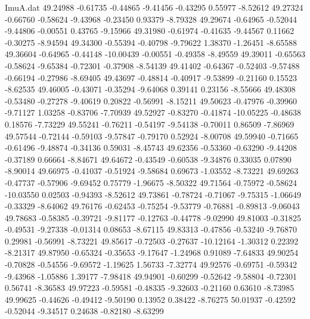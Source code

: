\begin{filecontents}{ImuA.dat}
  49.24988   -0.61735   -0.44865   -9.41456   -0.43295    0.55977   -8.52612
  49.27324   -0.66760   -0.58624   -9.43968   -0.23450    0.93379   -8.79328
  49.29674   -0.64965   -0.52044   -9.44806   -0.00551    0.43765   -9.15966
  49.31980   -0.61974   -0.41635   -9.44567    0.11662   -0.30275   -8.94594
  49.34300   -0.55394   -0.40798   -9.79622    1.38370   -1.26451   -8.65588
  49.36604   -0.64965   -0.44148  -10.00439   -0.00551   -0.49358   -8.49559
  49.39011   -0.65563   -0.58624   -9.65384   -0.72301   -0.37908   -8.54139
  49.41402   -0.64367   -0.52403   -9.57488   -0.66194   -0.27986   -8.69405
  49.43697   -0.48814   -0.40917   -9.53899   -0.21160    0.15523   -8.62535
  49.46005   -0.43071   -0.35294   -9.64068    0.39141    0.23156   -8.55666
  49.48308   -0.53480   -0.27278   -9.40619    0.20822   -0.56991   -8.15211
  49.50623   -0.47976   -0.39960   -9.71127    1.03258   -0.83706   -7.70939
  49.52927   -0.83270   -0.41874  -10.05225   -0.48638    0.18576   -7.73229
  49.55241   -0.76211   -0.54197   -9.54138   -0.70011    0.86509   -7.86969
  49.57544   -0.72144   -0.59103   -9.57847   -0.79170    0.52924   -8.00708
  49.59940   -0.71665   -0.61496   -9.48874   -0.34136    0.59031   -8.45743
  49.62356   -0.53360   -0.63290   -9.44208   -0.37189    0.66664   -8.84671
  49.64672   -0.43549   -0.60538   -9.34876    0.33035    0.07890   -8.90014
  49.66975   -0.41037   -0.51924   -9.58684    0.69673   -1.03552   -8.73221
  49.69263   -0.47737   -0.57906   -9.69452    0.75779   -1.96675   -8.50322
  49.71564   -0.75972   -0.58624  -10.03550    0.02503   -0.94393   -8.52612
  49.73861   -0.78724   -0.71067   -9.75315   -1.06649   -0.33329   -8.64062
  49.76176   -0.62453   -0.75254   -9.53779   -0.76881   -0.89813   -9.06043
  49.78683   -0.58385   -0.39721   -9.81177   -0.12763   -0.44778   -9.02990
  49.81003   -0.31825   -0.49531   -9.27338   -0.01314    0.08653   -8.67115
  49.83313   -0.47856   -0.53240   -9.76870    0.29981   -0.56991   -8.73221
  49.85617   -0.72503   -0.27637  -10.12164   -1.30312    0.22392   -8.21317
  49.87950   -0.65324   -0.35653   -9.17647   -1.24968    0.91089   -7.64833
  49.90254   -0.70828   -0.54556   -9.69572   -1.19625    1.56733   -7.32774
  49.92576   -0.69751   -0.59342   -9.43968   -1.05886    1.39177   -7.98418
  49.94901   -0.60299   -0.52642   -9.58804   -0.72301    0.56741   -8.36583
  49.97223   -0.59581   -0.48335   -9.32603   -0.21160    0.63610   -8.73985
  49.99625   -0.44626   -0.49412   -9.50190    0.13952    0.38422   -8.76275
  50.01937   -0.42592   -0.52044   -9.34517    0.24638   -0.82180   -8.63299

\end{filecontents}
